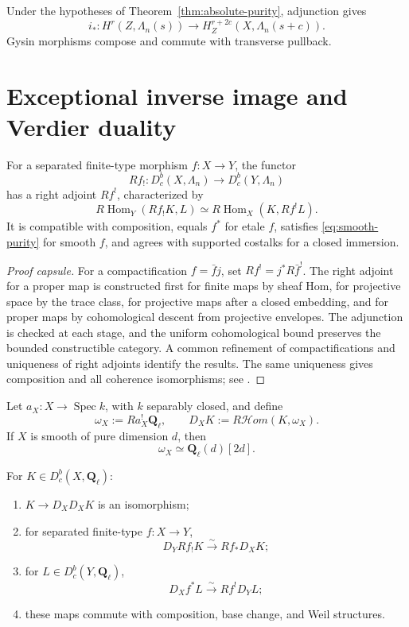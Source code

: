 \begin{corollary}
\label{cor:gysin}
Under the hypotheses of Theorem~\ref{thm:absolute-purity}, adjunction gives
\[
 i_*:H^r(Z,\Lambda_n(s))
 \longrightarrow H^{r+2c}_Z(X,\Lambda_n(s+c)).
\]
Gysin morphisms compose and commute with transverse pullback.
\end{corollary}

\section{Exceptional inverse image and Verdier duality}

\begin{theorem}[Existence of \(Rf^!\)]
\label{thm:exceptional-pullback}
For a separated finite-type morphism \(f:X\to Y\), the functor
\[
 Rf_!:D^b_c(X,\Lambda_n)\longrightarrow D^b_c(Y,\Lambda_n)
\]
has a right adjoint \(Rf^!\), characterized by
\[
 R\operatorname{Hom}_Y(Rf_!K,L)
 \simeq R\operatorname{Hom}_X(K,Rf^!L).
\tag{7.5}\label{eq:fshriek-adjunction}
\]
It is compatible with composition, equals \(f^*\) for etale \(f\), satisfies
\eqref{eq:smooth-purity} for smooth \(f\), and agrees with supported costalks
for a closed immersion.
\end{theorem}

\begin{proof}[Proof capsule]
For a compactification \(f=\bar f j\), set
\(Rf^!=j^*R\bar f^!\).  The right adjoint for a proper map is constructed
first for finite maps by sheaf Hom, for projective space by the trace class,
for projective maps after a closed embedding, and for proper maps by
cohomological descent from projective envelopes.  The adjunction is checked
at each stage, and the uniform cohomological bound preserves the bounded
constructible category.  A common refinement of compactifications and
uniqueness of right adjoints identify the results.  The same uniqueness gives
composition and all coherence isomorphisms; see
\cite[Expos\'e XVIII]{SGA4}.
\end{proof}

Let \(a_X:X\to\operatorname{Spec}k\), with \(k\) separably closed, and define
\[
 \omega_X:=Ra_X^!\mathbf Q_\ell,\qquad
 D_XK:=R\mathcal Hom(K,\omega_X).
\]
If \(X\) is smooth of pure dimension \(d\), then
\[
 \omega_X\simeq\mathbf Q_\ell(d)[2d].
\tag{7.6}\label{eq:smooth-dualizing}
\]

\begin{theorem}
\label{thm:verdier-duality}
For \(K\in D^b_c(X,\mathbf Q_\ell)\):
\begin{enumerate}
\item \(K\to D_XD_XK\) is an isomorphism;
\item for separated finite-type \(f:X\to Y\),
\[
 D_YRf_!K\xrightarrow{\sim}Rf_*D_XK;
\tag{7.7}\label{eq:verdier-push}
\]
\item for \(L\in D^b_c(Y,\mathbf Q_\ell)\),
\[
 D_Xf^*L\xrightarrow{\sim}Rf^!D_YL;
\tag{7.8}\label{eq:verdier-pull}
\]
\item these maps commute with composition, base change, and Weil structures.
\end{enumerate}
\end{theorem}

